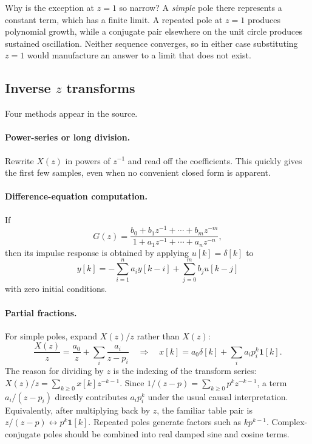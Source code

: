 \documentclass[11pt]{article}
\newcommand{\unitstep}{\mathbf{1}}
\newcommand{\weeklabel}[1]{\par\smallskip\noindent{\color{blue!60!black}\textbf{Taught in #1.}}\par\smallskip}
\begin{document}
Why is the exception at $z=1$ so narrow? A \emph{simple} pole there represents a constant term, which has a finite limit. A repeated pole at $z=1$ produces polynomial growth, while a conjugate pair elsewhere on the unit circle produces sustained oscillation. Neither sequence converges, so in either case substituting $z=1$ would manufacture an answer to a limit that does not exist.

\subsection{Inverse $z$ transforms}

\weeklabel{Week 2 (beginning here)}

Four methods appear in the source.

\paragraph{Power-series or long division.} Rewrite $X(z)$ in powers of $z^{-1}$ and read off the coefficients. This quickly gives the first few samples, even when no convenient closed form is apparent.

\paragraph{Difference-equation computation.} If
\[
G(z)=\frac{b_0+b_1z^{-1}+\cdots+b_mz^{-m}}
{1+a_1z^{-1}+\cdots+a_nz^{-n}},
\]
then its impulse response is obtained by applying $u[k]=\delta[k]$ to
\[
y[k]=-\sum_{i=1}^{n}a_i y[k-i]+\sum_{j=0}^{m}b_j u[k-j]
\]
with zero initial conditions.

\paragraph{Partial fractions.} For simple poles, expand $X(z)/z$ rather than $X(z)$:
\[
\frac{X(z)}{z}=\frac{a_0}{z}+\sum_i\frac{a_i}{z-p_i}
\quad\Longrightarrow\quad
x[k]=a_0\delta[k]+\sum_i a_ip_i^k\unitstep[k].
\]
The reason for dividing by $z$ is the indexing of the transform series:
$X(z)/z=\sum_{k\ge 0}x[k]z^{-k-1}$. Since
$1/(z-p)=\sum_{k\ge 0}p^kz^{-k-1}$, a term $a_i/(z-p_i)$ directly contributes
$a_i p_i^k$ under the usual causal interpretation. Equivalently, after
multiplying back by $z$, the familiar table pair is
$z/(z-p)\leftrightarrow p^k\unitstep[k]$.
Repeated poles generate factors such as $kp^{k-1}$. Complex-conjugate poles should be combined into real damped sine and cosine terms.
\end{document}
